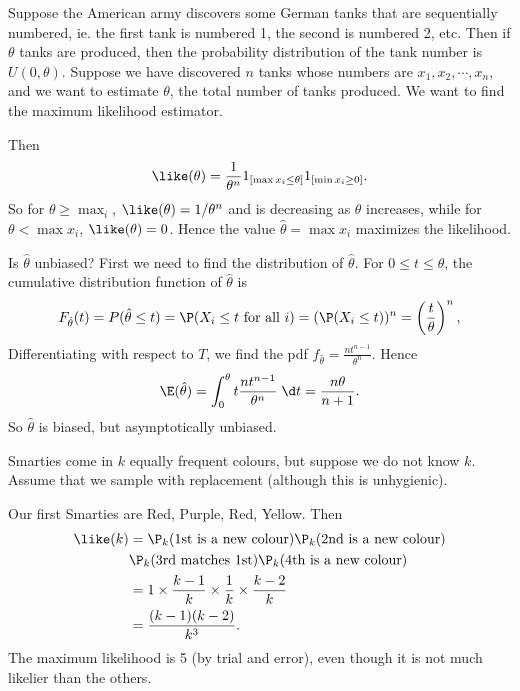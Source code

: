 \documentclass[a4paper]{article}
\begin{document}
\begin{eg}
   Suppose the American army discovers some German tanks that are sequentially numbered, ie. the first tank is numbered 1, the second is numbered 2, etc. Then if $\theta$ tanks are produced, then the probability distribution of the tank number is $U(0, \theta)$. Suppose we have discovered $n$ tanks whose numbers are $x_1, x_2, \cdots, x_n$, and we want to estimate $\theta$, the total number of tanks produced. We want to find the maximum likelihood estimator.

  Then
  \[
    \like(\theta) = \frac{1}{\theta^n}1_{[\max x_i \leq \theta]}1_{[\min x_i\geq 0]}.
  \]
  So for $\theta\geq \max _i$, $\like (\theta) = 1/\theta^n$ and is decreasing as $\theta$ increases, while for $\theta < \max x_i$, $\like (\theta) = 0$. Hence the value $\hat{\theta} = \max x_i$ maximizes the likelihood.

  Is $\hat{\theta}$ unbiased? First we need to find the distribution of $\hat{\theta}$. For $0 \leq t \leq \theta$, the cumulative distribution function of $\hat{\theta}$ is
  \[
    F_{\hat{\theta}}(t) = P(\hat{\theta} \leq t) = \P(X_i \leq t \text{ for all }i) = (\P(X_i \leq t))^n = \left(\frac{t}{\theta}\right)^n,
  \]
  Differentiating with respect to $T$, we find the pdf $f_{\hat{\theta}} = \frac{nt^{n - 1}}{\theta^n}$. Hence
  \[
    \E(\hat{\theta}) = \int_0^\theta t\frac{nt^{n - 1}}{\theta^n} \;\d t = \frac{n\theta}{n + 1}.
  \]
  So $\hat{\theta}$ is biased, but asymptotically unbiased.
\end{eg}

\begin{eg}
  Smarties come in $k$ equally frequent colours, but suppose we do not know $k$. Assume that we sample with replacement (although this is unhygienic).

  Our first Smarties are Red, Purple, Red, Yellow. Then
  \begin{align*}
  \like(k)&=\P_k(\text{1st is a new colour})\P_k(\text{2nd is a new colour})\\\
  & \P_k(\text{3rd matches 1st})\P_k(\text{4th is a new colour})\\
  &= 1\times \frac{k - 1}{k}\times \frac{1}{k}\times \frac{k - 2}{k}\\
  &= \frac{(k - 1)(k - 2)}{k^3}.
\end{align*}
The maximum likelihood is 5 (by trial and error), even though it is not much likelier than the others.
\end{eg}
\end{document}
